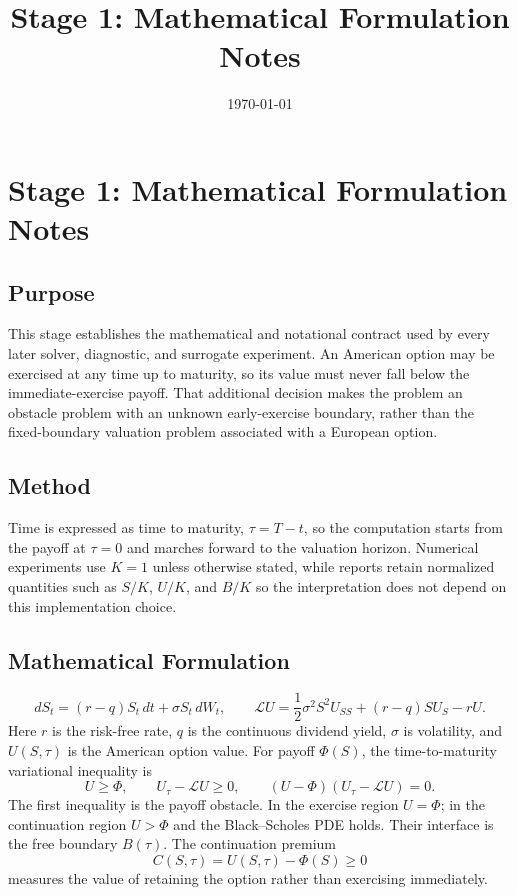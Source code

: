 \documentclass[11pt]{article}
\title{Stage 1: Mathematical Formulation Notes}
\date{\today}
\begin{document}
\maketitle

\section{Stage 1: Mathematical Formulation Notes}
\subsection{Purpose}
This stage establishes the mathematical and notational contract used by every
later solver, diagnostic, and surrogate experiment. An American option may be
exercised at any time up to maturity, so its value must never fall below the
immediate-exercise payoff. That additional decision makes the problem an
obstacle problem with an unknown early-exercise boundary, rather than the
fixed-boundary valuation problem associated with a European option.

\subsection{Method}
Time is expressed as time to maturity, $\tau=T-t$, so the computation starts
from the payoff at $\tau=0$ and marches forward to the valuation horizon.
Numerical experiments use $K=1$ unless otherwise stated, while reports retain
normalized quantities such as $S/K$, $U/K$, and $B/K$ so the interpretation
does not depend on this implementation choice.

\subsection{Mathematical Formulation}
\[
  dS_t=(r-q)S_t\,dt+\sigma S_t\,dW_t,
\qquad
  \mathcal{L}U=
  \frac{1}{2}\sigma^2S^2U_{SS}+(r-q)SU_S-rU.
\]
Here \(r\) is the risk-free rate, \(q\) is the continuous dividend yield,
\(\sigma\) is volatility, and \(U(S,\tau)\) is the American option value. For
payoff \(\Phi(S)\), the time-to-maturity variational inequality is
\[
  U\geq \Phi,\qquad
  U_\tau-\mathcal{L}U\geq0,\qquad
  (U-\Phi)(U_\tau-\mathcal{L}U)=0.
\]
The first inequality is the payoff obstacle. In the exercise region
\(U=\Phi\); in the continuation region \(U>\Phi\) and the Black--Scholes PDE
holds. Their interface is the free boundary \(B(\tau)\). The continuation
premium
\[
  C(S,\tau)=U(S,\tau)-\Phi(S)\geq0
\]
measures the value of retaining the option rather than exercising immediately.
\end{document}
